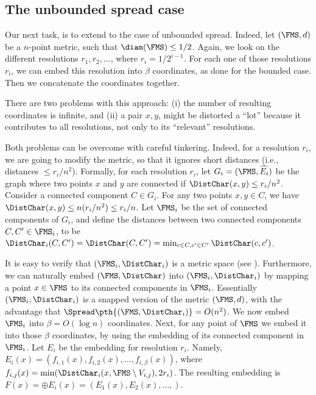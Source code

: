 \subsection{The unbounded spread case}

Our next task, is to extend  to the case
of unbounded spread. Indeed, let $(\FMS,d)$ be a $n$-point metric, such
that $\diam(\FMS) \leq 1/2$. Again, we look on the different resolutions
$r_1, r_2, \ldots$, where $r_i = 1/2^{i-1}$. For each one of those
resolutions $r_i$, we can embed this resolution into $\beta$
coordinates, as done for the bounded case. Then we concatenate the
coordinates together.

There are two problems with this approach: (i) the number of resulting
coordinates is infinite, and (ii) a pair $x,y$, might be distorted a
``lot'' because it contributes to all resolutions, not only to its
``relevant'' resolutions.

Both problems can be overcome with careful tinkering. Indeed, for a
resolution $r_i$, we are going to modify the metric, so that it
ignores short distances (i.e., distances $\leq r_i/n^2$).  Formally,
for each resolution $r_i$, let $G_i =(\FMS,\widehat{E_i})$ be the
graph where two points $x$ and $y$ are connected if $\DistChar(x,y) \leq
r_i/n^2$.  Consider a connected component $C \in G_i$. For any two
points $x, y \in C$, we have $\DistChar(x,y) \leq n( r_i/n^2 ) \leq
r_i/n$. Let $\FMS_i$ be the set of connected components of $G_i$, and
define the distances between two connected components $C, C' \in
\FMS_i$, to be $\DistChar_i(C, C') = \DistChar(C, C') = \min_{c \in C, c' \in
   C'} \DistChar(c, c')$.

It is easy to verify that $(\FMS_i, \DistChar_i)$ is a metric space (see
).  Furthermore, we can naturally
embed $(\FMS,\DistChar)$ into $(\FMS_i, \DistChar_i)$ by mapping a point $x
\in \FMS$ to its connected components in $\FMS_i$.  Essentially
$(\FMS_i,\DistChar_i)$ is a snapped version of the metric $(\FMS,d)$, with
the advantage that $\Spread\pth{ (\FMS, \DistChar_i) } = O(n^2)$. We now
embed $\FMS_i$ into $\beta = O(\log n)$ coordinates. Next, for any
point of $\FMS$ we embed it into those $\beta$ coordinates, by using
the embedding of its connected component in $\FMS_i$. Let $E_i$ be the
embedding for resolution $r_i$.  Namely, $E_i(x) = (f_{i,1}(x),
f_{i,2}(x), \ldots, f_{i,\beta}(x))$, where $f_{i,j}(x) = \min(
\DistChar_i(x, \FMS \setminus V_{i,j}), 2r_i )$.  The resulting embedding
is $F(x) = \oplus E_i(x) = (E_1(x), E_2(x), \ldots, )$.

